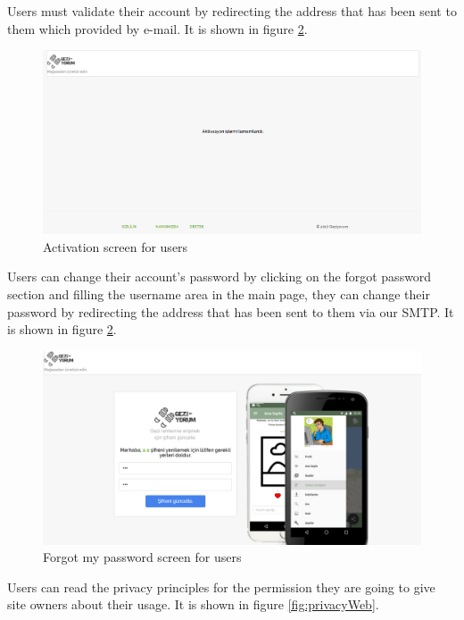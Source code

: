 Users must validate their account by redirecting the address that has been sent to them which provided by e-mail. It is shown in figure  \ref{fig:registerWeb}. 

\begin{figure}[!htbp]
\centering
\includegraphics[width=\textwidth]{projectChapters/images/activasion.png}
\caption{Activation screen for users}
\label{fig:registerWeb}
\end{figure}

\newpage

Users can change their account's password by clicking on the forgot password section and filling the username area in the main page, they can change their password by redirecting the address that has been sent to them via our SMTP. It is shown in figure  \ref{fig:registerWeb}. 

\begin{figure}[!htbp]
\centering
\includegraphics[width=\textwidth]{projectChapters/images/forgetpass.png}
\caption{Forgot my password screen for users}
\label{fig:registerWeb}
\end{figure}

Users can read the privacy principles for the permission they are going to give site owners about their usage. It is shown in figure  \ref{fig:privacyWeb}. 

